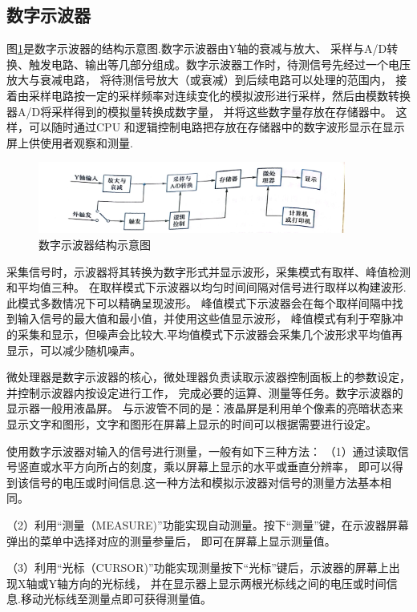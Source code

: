 \documentclass{ctexart}
\begin{document}
  \subsection{数字示波器}
  图\ref{shuzishiboqi}是数字示波器的结构示意图.数字示波器由Y轴的衰减与放大、
  采样与A/D转换、触发电路、输出等几部分组成。数字示波器工作时，待测信号先经过一个电压放大与衰减电路，
  将待测信号放大（或衰减）到后续电路可以处理的范围内，
  接着由采样电路按一定的采样频率对连续变化的模拟波形进行采样，然后由模数转换器A/D将采样得到的模拟量转换成数字量，
  并将这些数字量存放在存储器中。
  这样，可以随时通过CPU 和逻辑控制电路把存放在存储器中的数字波形显示在显示屏上供使用者观察和测量.
  \begin{figure}[H]\label{shuzishiboqi}
    \centering
    \includegraphics[width=0.9\textwidth,height=0.2\textheight]{shuzishiboqi.jpg}
    \caption{数字示波器结构示意图}
  \end{figure}

  采集信号时，示波器将其转换为数字形式并显示波形，采集模式有取样、峰值检测和平均值三种。
  在取样模式下示波器以均匀时间间隔对信号进行取样以构建波形.此模式多数情况下可以精确呈现波形。
  峰值模式下示波器会在每个取样间隔中找到输入信号的最大值和最小值，并使用这些值显示波形，
  峰值模式有利于窄脉冲的采集和显示，但噪声会比较大.平均值模式下示波器会采集几个波形求平均值再显示，可以减少随机噪声。

  微处理器是数字示波器的核心，微处理器负责读取示波器控制面板上的参数设定，并控制示波器内按设定进行工作，
  完成必要的运算、测量等任务。数字示波器的显示器一般用液晶屏。
  与示波管不同的是：液晶屏是利用单个像素的亮暗状态来显示文字和图形，文字和图形在屏幕上显示的时间可以根据需要进行设定。
  
  使用数字示波器对输入的信号进行测量，一般有如下三种方法：
  （1）通过读取信号竖直或水平方向所占的刻度，乘以屏幕上显示的水平或垂直分辨率，
  即可以得到该信号的电压或时间信息.这一种方法和模拟示波器对信号的测量方法基本相同。

  （2）利用“测量（MEASURE)”功能实现自动测量。按下“测量”键，在示波器屏幕弹出的菜单中选择对应的测量参量后，
  即可在屏幕上显示测量值。

  （3）利用“光标（CURSOR)”功能实现测量按下“光标”键后，示波器的屏幕上出现X轴或Y轴方向的光标线，
  并在显示器上显示两根光标线之间的电压或时间信息.移动光标线至测量点即可获得测量值。
\end{document}
